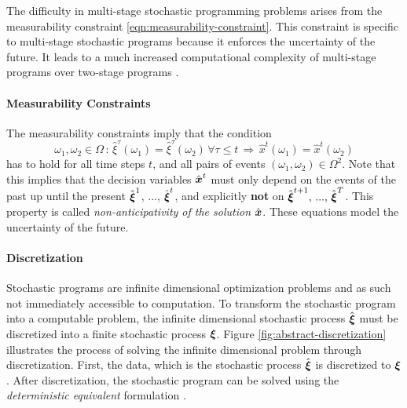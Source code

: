 The difficulty in multi-stage stochastic programming problems arises from the measurability constraint \eqref{eqn:measurability-constraint}.
This constraint is specific to multi-stage stochastic programs because it enforces the uncertainty of the future. It leads to a much increased computational complexity of multi-stage programs over two-stage programs \citep{Shapiro2005,Shapiro2008}.
%
\paragraph{Measurability Constraints}
The measurability constraints imply that the condition
\begin{equation}
  \label{eq:mathematical-NAC}
  \omega_1,\omega_2\in \Omega \, : \, \hat{\xi}^\tau(\omega_1) = \hat{\xi}^\tau(\omega_2)\,\forall \tau\leq t\,\Rightarrow \,  \hat{x}^t(\omega_1) =  \hat{x}^t(\omega_2)
\end{equation}
has to hold for all time steps $t$, and all pairs of events $(\omega_1,\omega_2)\in\Omega^2$.
Note that this implies that the decision variables $\hat{\boldsymbol x}^t$ must only depend on the events of the past up until the present $\hat{\boldsymbol\xi}^1$, ..., $\hat{\boldsymbol\xi}^t$, and explicitly \textbf{not} on $\hat{\boldsymbol\xi}^{t+1},\, ...,\,\hat{\boldsymbol\xi}^T$.
This property is called \textit{non-anticipativity of the solution} $\hat{\boldsymbol x}$.
These equations model the uncertainty of the future.
%
\paragraph{Discretization}
%
Stochastic programs are infinite dimensional optimization problems and as such not immediately accessible to computation.
To transform the stochastic program into a computable problem, the infinite dimensional stochastic process $\hat{\boldsymbol\xi}$ must be discretized into a finite stochastic process $\boldsymbol\xi$. Figure \ref{fig:abstract-discretization} illustrates the process of solving the infinite dimensional problem through discretization.
First, the data, which is the stochastic process $\hat{\boldsymbol\xi}$ is discretized to $\boldsymbol\xi$.
After discretization, the stochastic program can be solved using the \textit{deterministic equivalent} formulation \citep{Birge1997}.

